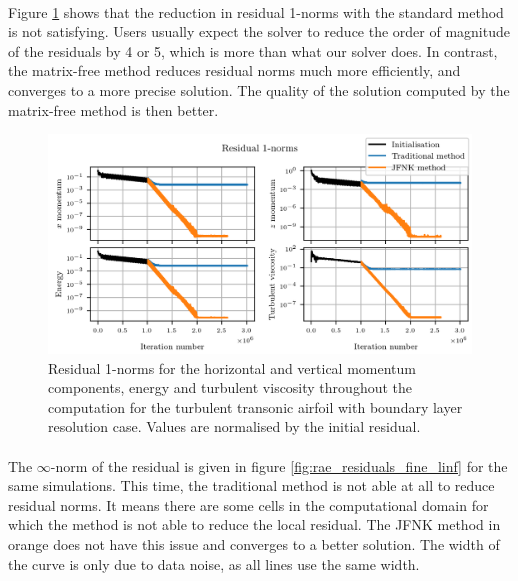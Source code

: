         \paragraph{}
        Figure \ref{fig:rae_residuals_fine_l1} shows that the reduction in residual 1-norms with the standard method is not satisfying.
        Users usually expect the solver to reduce the order of magnitude of the residuals by 4 or 5, which is more than what our solver does.
        In contrast, the matrix-free method reduces residual norms much more efficiently, and converges to a more precise solution.
        The quality of the solution computed by the matrix-free method is then better.

        \begin{figure}
          \centering
          \includegraphics{figures/rae_residuals_fine_l1.png}
          \caption{Residual 1-norms for the horizontal and vertical momentum components, energy and turbulent viscosity throughout the computation for the turbulent transonic airfoil with boundary layer resolution case.
          Values are normalised by the initial residual.}
          \label{fig:rae_residuals_fine_l1}
        \end{figure}

        \paragraph{}
        The $\infty$-norm of the residual is given in figure \ref{fig:rae_residuals_fine_linf} for the same simulations.
        This time, the traditional method is not able at all to reduce residual norms.
        It means there are some cells in the computational domain for which the method is not able to reduce the local residual.
        The JFNK method in orange does not have this issue and converges to a better solution.
        The width of the curve is only due to data noise, as all lines use the same width.

